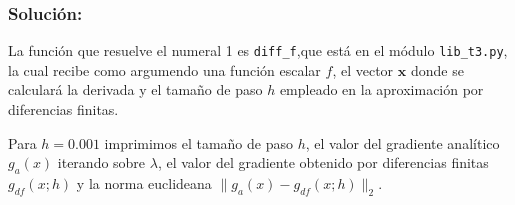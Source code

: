 \documentclass[11pt]{article}
\begin{document}
\hypertarget{soluciuxf3n}{%
\subsubsection{Solución:}\label{soluciuxf3n}}

    La función que resuelve el numeral 1 es \texttt{diff\_f},que está en el
módulo \texttt{lib\_t3.py}, la cual recibe como argumendo una función
escalar \(f\), el vector \(\mathbf{x}\) donde se calculará la derivada y
el tamaño de paso \(h\) empleado en la aproximación por diferencias
finitas.

Para \(h=0.001\) imprimimos el tamaño de paso \(h\), el valor del
gradiente analítico \(g_a(x)\) iterando sobre \(\lambda\), el valor del
gradiente obtenido por diferencias finitas \(g_{df}(x;h)\) y la norma
euclideana \(\lVert g_a(x)-g_{df}(x;h) \rVert_2\).
\end{document}
